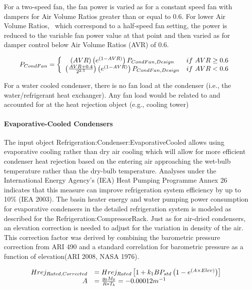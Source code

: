 For a two-speed fan, the fan power is varied as for a constant speed fan with dampers for Air Volume Ratios greater than or equal to 0.6. For lower Air Volume Ratios,~ which correspond to a half-speed fan setting, the power is reduced to the variable fan power value at that point and then varied as for damper control below Air Volume Ratios (AVR) of 0.6.

\begin{equation}
  P_{CondFan} = \left\{ \begin{array}{cr}
                          \left(AVR\right)\left(e^{\left(1-AVR\right)}\right)P_{CondFan,Design} & if~AVR \geq 0.6 \\
                          \left(\frac{AVR+0.4}{2^{2.5}}\right)\left(e^{\left(1-AVR\right)}\right)P_{CondFan,Design} & if~AVR < 0.6
                        \end{array}
                \right.
\end{equation}

For a water cooled condenser, there is no fan load at the condenser (i.e., the~ water/refrigerant heat exchanger). Any fan load would be related to and accounted for at the heat rejection object (e.g., cooling tower)

\paragraph{Evaporative-Cooled Condensers}\label{evaporative-cooled-condensers}

The input object Refrigeration:Condenser:EvaporativeCooled allows using evaporative cooling rather than dry air cooling which will allow for more efficient condenser heat rejection based on the entering air approaching the wet-bulb temperature rather than the dry-bulb temperature. Analyses under the International Energy Agency's (IEA) Heat Pumping Programme Annex 26 indicates that this measure can improve refrigeration system efficiency by up to 10\% (IEA 2003). The basin heater energy and water pumping power consumption for evaporative condensers in the detailed refrigeration system is modeled as described for the Refrigeration:CompressorRack. Just as for air-dried condensers, an elevation correction is needed to adjust for the variation in density of the air. This correction factor was derived by combining the barometric pressure correction from ARI 490 and a standard correlation for barometric pressure as a function of elevation(ARI 2008, NASA 1976).

\begin{equation}
  \begin{array}{rl}
    Hrej_{Rated,Corrected} &= Hrej_{Rated} \left[ 1 + k_1 B P_{std} \left(1 - e^{\left(A \times Elev\right)}\right)\right] \\
    A &= \frac{g_0 M_0}{R* T_b} = - 0.00012m^{-1}
  \end{array}
\end{equation}

